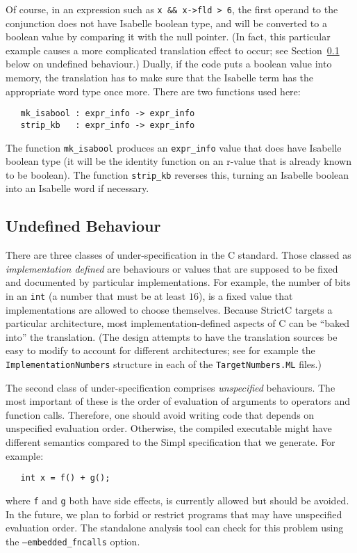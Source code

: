 \documentclass{article}
\newcommand{\strictc}{\textsf{StrictC}}
\newcommand{\MLsuffix}{.ML}
\newcommand{\srcfile}[1]{\texttt{#1}}
\newcommand{\MLfile}[1]{\srcfile{#1\MLsuffix}}
\begin{document}
Of course, in an expression such as \verb|x && x->fld > 6|, the first
operand to the conjunction does not have Isabelle boolean type, and
will be converted to a boolean value by comparing it with the null
pointer.  (In fact, this particular example causes a more complicated
translation effect to occur; see Section~\ref{sec:undefined-behaviour}
below on undefined behaviour.)  Dually, if the code puts a boolean
value into memory, the translation has to make sure that the Isabelle
term has the appropriate word type once more.  There are two functions
used here:
\begin{verbatim}
   mk_isabool : expr_info -> expr_info
   strip_kb   : expr_info -> expr_info
\end{verbatim}
The function \texttt{mk_isabool} produces an \texttt{expr_info} value
that does have Isabelle boolean type (it will be the identity function
on an r-value that is already known to be boolean).  The function
\texttt{strip_kb} reverses this, turning an Isabelle boolean into an
Isabelle word if necessary.

\subsection{Undefined Behaviour}
\label{sec:undefined-behaviour}

There are three classes of under-specification in the C standard.
Those classed as \emph{implementation defined} are behaviours or
values that are supposed to be fixed and documented by particular
implementations.  For example, the number of bits in an \texttt{int}
(a number that must be at least $16$), is a fixed value that implementations
are allowed to choose themselves.  Because \strictc{} targets a
particular architecture, most implementation-defined aspects of C can
be ``baked into'' the translation.  (The design attempts to have the
translation sources be easy to modify to account for different
architectures; see for example the \texttt{ImplementationNumbers}
structure in each of the \MLfile{TargetNumbers} files.)

The second class of under-specification comprises \emph{unspecified}
behaviours.  The most important of these is the order of evaluation of
arguments to operators and function calls.
Therefore, one should avoid writing code that depends on unspecified
evaluation order. Otherwise, the compiled executable might have
different semantics compared to the Simpl specification that we
generate. For example:
\begin{verbatim}
   int x = f() + g();
\end{verbatim}
where \texttt{f} and \texttt{g} both have side effects, is currently
allowed but should be avoided. In the future, we plan to forbid or
restrict programs that may have unspecified evaluation order.
The standalone analysis tool can check for this problem using the
\texttt{--embedded\_fncalls} option.
\end{document}
